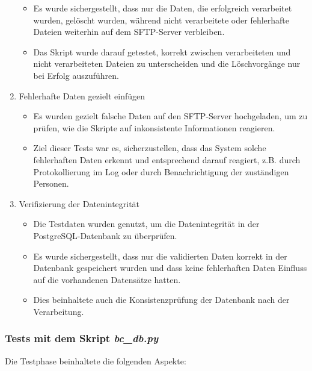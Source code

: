 \begin{enumerate}
\begin{itemize}
        \item Es wurde sichergestellt, dass nur die Daten, die erfolgreich verarbeitet wurden, gelöscht wurden, während nicht verarbeitete oder fehlerhafte Dateien weiterhin auf dem SFTP-Server verbleiben.
        \item Das Skript wurde darauf getestet, korrekt zwischen verarbeiteten und nicht verarbeiteten Dateien zu unterscheiden und die Löschvorgänge nur bei Erfolg auszuführen.
    \end{itemize}
    \item Fehlerhafte Daten gezielt einfügen
    \begin{itemize}
        \item Es wurden gezielt falsche Daten auf den SFTP-Server hochgeladen, um zu prüfen, wie die Skripte auf inkonsistente Informationen reagieren.
        \item Ziel dieser Tests war es, sicherzustellen, dass das System solche fehlerhaften Daten erkennt und entsprechend darauf reagiert, z.B. durch Protokollierung im Log oder durch Benachrichtigung der zuständigen Personen.
    \end{itemize}
    \item Verifizierung der Datenintegrität
    \begin{itemize}
        \item Die Testdaten wurden genutzt, um die Datenintegrität in der PostgreSQL-Datenbank zu überprüfen.
        \item Es wurde sichergestellt, dass nur die validierten Daten korrekt in der Datenbank gespeichert wurden und dass keine fehlerhaften Daten Einfluss auf die vorhandenen Datensätze hatten.
        \item Dies beinhaltete auch die Konsistenzprüfung der Datenbank nach der Verarbeitung.
    \end{itemize}
\end{enumerate}

\subsubsection{Tests mit dem Skript \textit{bc\_db.py}}
\label{sec:Tests mit dem Skript bc_db.py}

Die Testphase beinhaltete die folgenden Aspekte:


